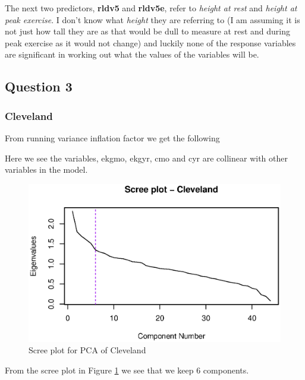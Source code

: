 \documentclass[a4paper]{article}
\begin{document}
\newpage
The next two predictors, \textbf{rldv5} and \textbf{rldv5e}, refer to
\textit{height at rest} and \textit{height at peak exercise}. I don't know what
\textit{height} they are referring to (I am assuming it is not just how tall
they are as that would be dull to measure at rest and during peak exercise as it
would not change) and luckily none of the response variables are significant in
working out what the values of the variables will be.



\newpage
\subsection{Question 3}

\subsubsection{Cleveland}

From running variance inflation factor we get the following



Here we see the variables, ekgmo, ekgyr, cmo and cyr are collinear with other variables in the model.


\begin{figure}[H]
	\begin{center}
		\includegraphics[width=12cm]{question3output/clescreeplot.eps}
	\end{center}
	\caption{Scree plot for PCA of Cleveland}
	\label{q3-cle-screeplot}
\end{figure}

From the scree plot in Figure \ref{q3-cle-screeplot} we see that we keep 6 components.
\end{document}
